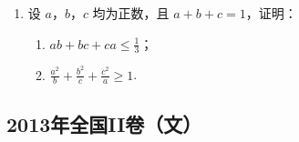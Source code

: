 \begin{description}
\begin{enumerate}[leftmargin=5pt]
\begin{enumerate}
\item 求 \(M\) 的轨迹的参数方程；
\item 将 \(M\) 到坐标原点的距离 \(d\) 表示为 \(\alpha\) 的函数，并判断 \(M\) 的轨迹是否过坐标原点.
\end{enumerate}

        \item 设 \(a\)，\(b\)，\(c\) 均为正数，且 \(a + b + c = 1\)，证明：

\begin{enumerate}
\item \(ab + bc + ca \leqslant \frac{1}{3}\)；
\item \(\frac{a^2}{b} + \frac{b^2}{c} + \frac{c^2}{a} \geqslant 1\).
\end{enumerate}

    \end{enumerate}

\end{description}


\subsection{2013年全国II卷（文）}\label{gk:2013年全国II卷（文）}

